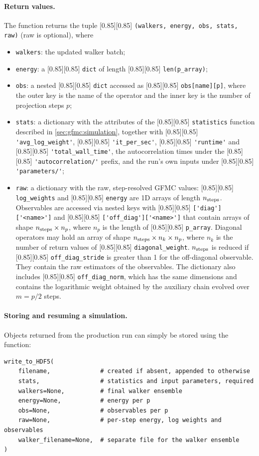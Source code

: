 \documentclass{SciPost}
\newcommand{\pyinline}[1]{\begingroup\setlength{\fboxsep}{0pt}%
  \colorbox{gray!15}{\raisebox{0pt}[0.85\ht\strutbox][0.85\dp\strutbox]{%
    \hspace{1pt}\lstinline{#1}\hspace{1pt}}}\endgroup}
\newcommand{\pyinlinebold}[1]{\begingroup\lstset{basicstyle=\ttfamily\bfseries\footnotesize}\lstinline{#1}\endgroup}
\newcommand{\nsteps}{n_{\rm steps}}
\begin{document}
\paragraph{Return values.} The function returns the tuple \pyinline{(walkers, energy, obs, stats, raw)} (raw is optional), where
\begin{apilistbox}
\begin{itemize}
	\item \pyinlinebold{walkers}: the updated walker batch;
	\item \pyinlinebold{energy}: a \pyinline{dict} of length \pyinline{len(p_array)};
	\item \pyinlinebold{obs}: a nested \pyinline{dict} accessed as \pyinline{obs[name][p]}, where the outer key is the name of the operator and the inner key is the number of projection steps $p$;
	\item \pyinlinebold{stats}: a dictionary with the attributes of the \pyinline{statistics} function described in \autoref{sec:gfmc:simulation}, together with \pyinline{'avg_log_weight'}, \pyinline{'it_per_sec'}, \pyinline{'runtime'} and \pyinline{'total_wall_time'}, the autocorrelation times under the \pyinline{'autocorrelation/'} prefix, and the run's own inputs under \pyinline{'parameters/'};
	\item \pyinlinebold{raw}: a dictionary with the raw, step-resolved GFMC values: \pyinline{log_weights} and \pyinline{energy} are 1D arrays of length $\nsteps$.
		Observables are accessed via nested keys with \pyinline{['diag']['<name>']} and \pyinline{['off_diag']['<name>']} that contain arrays of shape $\nsteps \times n_p$, where $n_p$ is the length of \pyinline{p_array}.
		Diagonal operators may hold an array of shape $\nsteps \times n_k \times n_p$, where $n_k$ is the number of return values of \pyinline{diagonal_weight}.
		$\nsteps$ is reduced if \pyinline{off_diag_stride} is greater than 1 for the off-diagonal observable.
		They contain the raw estimators of the observables.
		The dictionary also includes \pyinline{off_diag_norm}, which has the same dimensions and contains the logarithmic weight obtained by the auxiliary chain evolved over $m=p/2$ steps.
\end{itemize}
\end{apilistbox}

\paragraph{Storing and resuming a simulation.} Objects returned from the production run can simply be stored using the function:
\begin{lstlisting}
write_to_HDF5(
    filename,              # created if absent, appended to otherwise
    stats,                 # statistics and input parameters, required
    walkers=None,          # final walker ensemble
    energy=None,           # energy per p
    obs=None,              # observables per p
    raw=None,              # per-step energy, log weights and observables
    walker_filename=None,  # separate file for the walker ensemble
)
\end{lstlisting}
\end{document}
